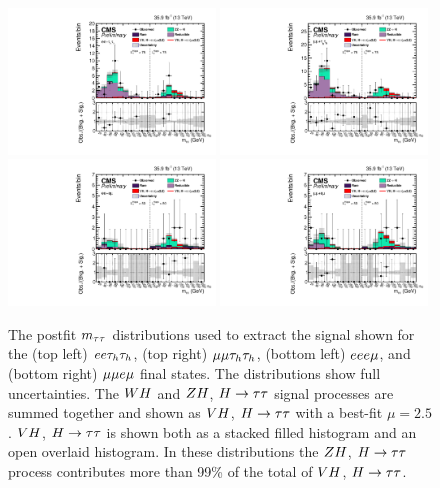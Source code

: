 \begin{figure}[h!]
 \begin{center}
  \includegraphics[width=0.49\textwidth]{higgs_to_taus_vh/plots/zh/eett_postfit.pdf}
  \includegraphics[width=0.49\textwidth]{higgs_to_taus_vh/plots/zh/mmtt_postfit.pdf}
  \includegraphics[width=0.49\textwidth]{higgs_to_taus_vh/plots/zh/eeem_postfit.pdf}
  \includegraphics[width=0.49\textwidth]{higgs_to_taus_vh/plots/zh/emmm_postfit.pdf}
 \end{center}
 \caption{The postfit $m_{\tau\tau}$ distributions used to extract the signal shown
  for the (top left) $ee\tau_{h}\tau_{h}$, (top right) $\mu\mu\tau_{h}\tau_{h}$, 
  (bottom left) $eee\mu$, and (bottom right) $\mu\mu e\mu$
  final states. The distributions show full uncertainties.
  The $WH$ and $ZH$, $H\to\tau\tau$ signal processes are summed together and 
  shown as $VH$, $H\to\tau\tau$ with a best-fit $\mu = 2.5$. $VH$, $H\to\tau\tau$ is shown both as 
  a stacked filled histogram and an open overlaid histogram. In these distributions 
  the $ZH$, $H\to\tau\tau$ process contributes more than 99\% of the total of $VH$, $H\to\tau\tau$.
 }
 \label{fig:zh_all_eight2}
\end{figure}

